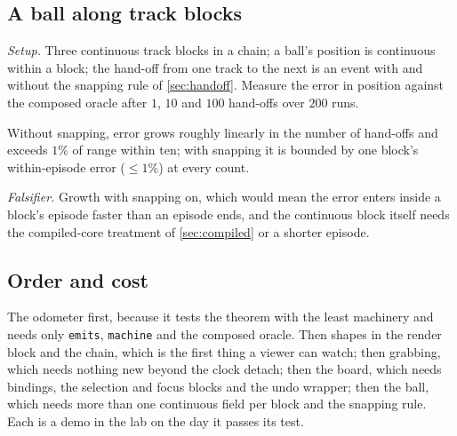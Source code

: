 \subsection{A ball along track blocks}
\label{sec:demo-ball}

\emph{Setup.} Three continuous track blocks in a chain; a ball's position is continuous within a block; the
hand-off from one track to the next is an event with and without the snapping rule of \cref{sec:handoff}.
Measure the error in position against the composed oracle after $1$, $10$ and $100$ hand-offs over $200$ runs.

\begin{prediction}
\label{pred:ball}
Without snapping, error grows roughly linearly in the number of hand-offs and exceeds $1\%$ of range within
ten; with snapping it is bounded by one block's within-episode error ($\le1\%$) at every count.
\end{prediction}
\emph{Falsifier.} Growth with snapping on, which would mean the error enters inside a block's episode faster
than an episode ends, and the continuous block itself needs the compiled-core treatment of \cref{sec:compiled}
or a shorter episode.

\subsection{Order and cost}
The odometer first, because it tests the theorem with the least machinery and needs only \texttt{emits},
\texttt{machine} and the composed oracle. Then shapes in the render block and the chain, which is the first
thing a viewer can watch; then grabbing, which needs nothing new beyond the clock detach; then the board, which
needs bindings, the selection and focus blocks and the undo wrapper; then the ball, which needs more than one
continuous field per block and the snapping rule. Each is a demo in the lab on the day it passes its test.
